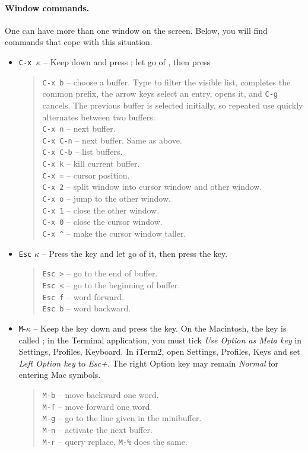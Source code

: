 \documentclass[a4paper,12pt,openany]{book}
\begin{document}
\paragraph{Window commands.} One can have more
than one window on the screen. Below, you will
find commands that cope with this situation.
\begin{itemize}
\item \verb|C-x |$\kappa$ -- Keep  down and press ;
let go of , then press \keys{$\kappa$}
\begin{quote}
\verb|C-x b| -- choose a buffer. Type to filter the visible list,
 completes the common prefix, the arrow keys select an entry,
 opens it, and \verb|C-g| cancels. The previous buffer is
selected initially, so repeated use quickly alternates between two buffers.\\
\verb|C-x n| -- next buffer.\\
\verb|C-x C-n| -- next buffer. Same as above.\\
\verb|C-x C-b| -- list buffers.\\
\verb|C-x k| -- kill current buffer.\\
\verb|C-x =| -- cursor position.\\
\verb|C-x 2| -- split window into cursor window and other window.\\
\verb|C-x o| -- jump to the other window.\\
\verb|C-x 1| -- close the other window.\\
\verb|C-x 0| -- close the cursor window.\\
\verb|C-x ^| -- make the cursor window taller.
\end{quote}
\item \verb|Esc| $\kappa$ -- Press the  key and let go of it,
then press the \keys{$\kappa$} key.
\begin{quote}
\verb|Esc >| -- go to the end of buffer.\\
\verb|Esc <| -- go to the beginning of buffer.\\
\verb|Esc f| -- word forward.\\
\verb|Esc b| -- word backward.\\
\end{quote}
\item \verb|M|-$\kappa$ -- Keep the  key
down and press the \keys{$\kappa$} key. On the Macintosh,
the  key is called ; in the Terminal
application, you must tick {\em Use Option as Meta key}
in Settings, Profiles, Keyboard. In iTerm2, open Settings,
Profiles, Keys and set {\em Left Option key} to {\em Esc+}.
The right Option key may remain {\em Normal} for entering Mac symbols.
\begin{quote}
\verb|M-b| -- move backward one word.\\
\verb|M-f| -- move forward one word.\\
\verb|M-g| -- go to the line given in the minibuffer.\\
\verb|M-n| -- activate the next buffer.\\
\verb|M-r| -- query replace. \verb|M-%| does the same.
\end{quote}
\end{itemize}
\end{document}

